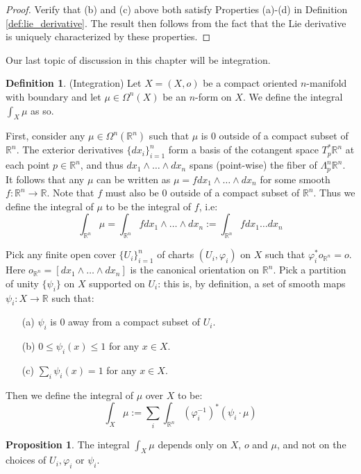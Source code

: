 \documentclass[12pt]{article}
\theoremstyle{definition}
\newtheorem{definition}[theorem]{Definition}
\newtheorem{proposition}[theorem]{Proposition}
\numberwithin{equation}{section}
\newcommand{\R}{{\mathbb R}}
\begin{document}
\begin{proof} Verify that (b) and (c) above both satisfy Properties (a)-(d) in Definition \ref{def:lie_derivative}. The result then follows from the fact that the Lie derivative is uniquely characterized by these properties.
\end{proof}

Our last topic of discussion in this chapter will be integration. 

\begin{definition} \label{def:integration} (Integration) Let $X = (X,o)$ be a compact oriented $n$-manifold with boundary and let $\mu \in \Omega^n(X)$ be an $n$-form on $X$. We define the integral $\int_X \mu$ as so.

First, consider any $\mu \in \Omega^n(\R^n)$ such that $\mu$ is $0$ outside of a compact subset of $\R^n$. The exterior derivatives $\{dx_i\}_{i=1}^n$ form a basis of the cotangent space $T^*_p\R^n$ at each point $p \in \R^n$, and thus $dx_1 \wedge \dots \wedge dx_n$ spans (point-wise) the fiber of $\Lambda^n_p\R^n$. It follows that any $\mu$ can be written as $\mu = f dx_1 \wedge \dots \wedge dx_n$ for some smooth $f:\R^n \to \R$. Note that $f$ must also be $0$ outside of a compact subset of $\R^n$. Thus we define the integral of $\mu$ to be the integral of $f$, i.e:
\[
\int_{\R^n} \mu = \int_{\R^n} f dx_1 \wedge \dots \wedge dx_n := \int_{\R^n} f dx_1 \dots dx_n
\]

Pick any finite open cover $\{U_i\}_{i=1}^n$ of charts $(U_i,\varphi_i)$ on $X$ such that $\varphi_i^*o_{\mathbb{R}^n} = o$. Here $o_{\R^n} = [dx_1 \wedge \dots \wedge dx_n]$ is the canonical orientation on $\R^n$. Pick a partition of unity $\{\psi_i\}$ on $X$ supported on $U_i$: this is, by definition, a set of smooth maps $\psi_i:X \to \R$ such that:
\begin{itemize}
\item[(a)] $\psi_i$ is $0$ away from a compact subset of $U_i$.
\item[(b)] $0 \le \psi_i(x) \le 1$ for any $x \in X$.
\item[(c)] $\sum_i \psi_i(x) = 1$ for any $x \in X$.
\end{itemize}
Then we define the integral of $\mu$ over $X$ to be:
\[
\int_X \mu := \sum_i \int_{\R^n} (\varphi_i^{-1})^*(\psi_i \cdot \mu)
\]
\end{definition}

\begin{proposition} \label{prop:integral_well_definedness} The integral $\int_X \mu$ depends only on $X$, $o$ and $\mu$, and not on the choices of $U_i, \varphi_i$ or $\psi_i$.
\end{proposition}
\end{document}
